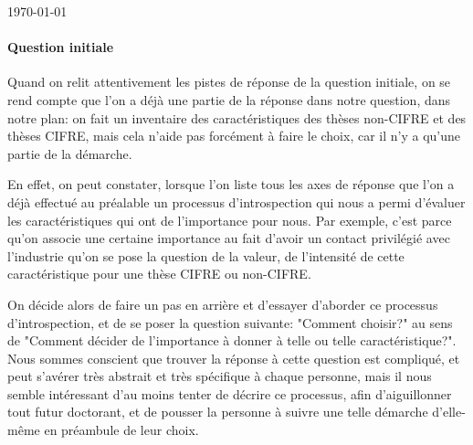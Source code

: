 \documentclass[12pt]{article}
\begin{document}
\begin{titlepage}
	\vfill
	
	\begin{center}
    \end{center}
	
	\vfill\vfill %
	
	{\large\today} %

	
	
	\vfill %
	
\end{titlepage}

\paragraph{Question initiale} %



Quand on relit attentivement les pistes de réponse de la question initiale, on se rend compte que l'on a déjà une partie de la réponse dans notre question, dans notre plan: on fait un inventaire des caractéristiques des thèses non-CIFRE et des thèses CIFRE, mais cela n'aide pas forcément à faire le choix, car il n'y a qu'une partie de la démarche.

En effet, on peut constater, lorsque l'on liste tous les axes de réponse que l'on a déjà effectué au préalable un processus d'introspection qui nous a permi d'évaluer les caractéristiques qui ont de l'importance pour nous. Par exemple, c'est parce qu'on associe une certaine importance au fait d'avoir un contact privilégié avec l'industrie qu'on se pose la question de la valeur, de l'intensité de cette caractéristique pour une thèse CIFRE ou non-CIFRE.

On décide alors de faire un pas en arrière et d'essayer d'aborder ce processus d'introspection, et de se poser la question suivante: "Comment choisir?" au sens de "Comment décider de l'importance à donner à telle ou telle caractéristique?". Nous sommes conscient que trouver la réponse à cette question est compliqué, et peut s'avérer très abstrait et très spécifique à chaque personne, mais il nous semble intéressant d'au moins tenter de décrire ce processus, afin d'aiguillonner tout futur doctorant, et de pousser la personne à suivre une telle démarche d'elle-même en préambule de leur choix.
\end{document}
